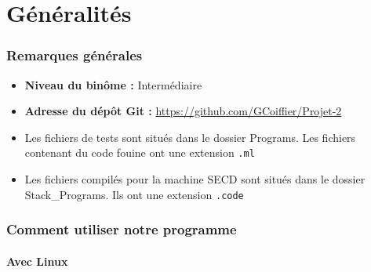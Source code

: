 \part{Généralités}

\section*{Remarques générales}

\begin{itemize}
 \setlength\itemsep{3pt}
 \item \textbf{Niveau du binôme :} Intermédiaire
 \item \textbf{Adresse du dépôt Git :} \url{https://github.com/GCoiffier/Projet-2}
 \item Les fichiers de tests sont situés dans le dossier Programs. Les fichiers contenant du code fouine ont une extension \texttt{.ml}
 \item Les fichiers compilés pour la machine SECD sont situés dans le dossier Stack\_Programs. Ils ont une extension \texttt{.code}
 \end{itemize}

\section{Comment utiliser notre programme}

\subsection{Avec Linux}

